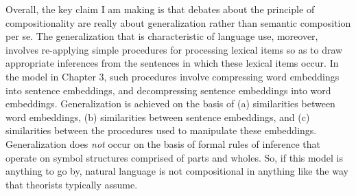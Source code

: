 Overall, the key claim I am making is that debates about the principle of compositionality are really about generalization rather than semantic composition per se. The generalization that is characteristic of language use, moreover, involves re-applying simple procedures for processing lexical items so as to draw appropriate inferences from the sentences in which these lexical items occur. In the model in Chapter 3, such procedures involve compressing word embeddings into sentence embeddings, and decompressing sentence embeddings into word embeddings. Generalization is achieved on the basis of (a) similarities between word embeddings, (b) similarities between sentence embeddings, and (c) similarities between the procedures used to manipulate these embeddings.  Generalization does \textit{not} occur on the basis of formal rules of inference that operate on symbol structures comprised of parts and wholes. So, if this model is anything to go by, natural language is not compositional in anything like the way that theorists typically assume. 
